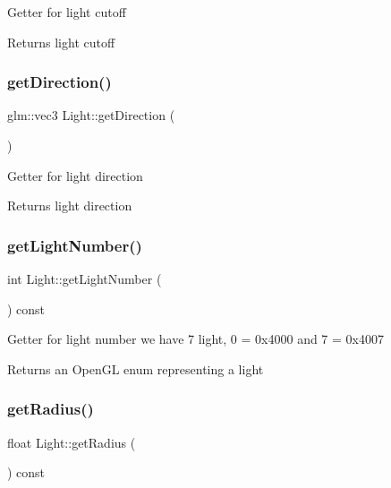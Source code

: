 Getter for light cutoff \begin{DoxyReturn}{Returns}
light cutoff 
\end{DoxyReturn}
\mbox{\label{classLight_ae10c348537ea57b655960f027731fbf3}} 
\subsubsection{\texorpdfstring{get\+Direction()}{getDirection()}}
{\footnotesize\ttfamily glm\+::vec3 Light\+::get\+Direction (\begin{DoxyParamCaption}{ }\end{DoxyParamCaption})}

Getter for light direction \begin{DoxyReturn}{Returns}
light direction 
\end{DoxyReturn}
\mbox{\label{classLight_ad718ac25026b144b6cd1366742b18468}} 
\subsubsection{\texorpdfstring{get\+Light\+Number()}{getLightNumber()}}
{\footnotesize\ttfamily int Light\+::get\+Light\+Number (\begin{DoxyParamCaption}{ }\end{DoxyParamCaption}) const}

Getter for light number we have 7 light, 0 = 0x4000 and 7 = 0x4007 \begin{DoxyReturn}{Returns}
an Open\+GL enum representing a light 
\end{DoxyReturn}
\mbox{\label{classLight_a6bb146ceb8e047d6fa7660e0aa5dca9d}} 
\subsubsection{\texorpdfstring{get\+Radius()}{getRadius()}}
{\footnotesize\ttfamily float Light\+::get\+Radius (\begin{DoxyParamCaption}{ }\end{DoxyParamCaption}) const}

